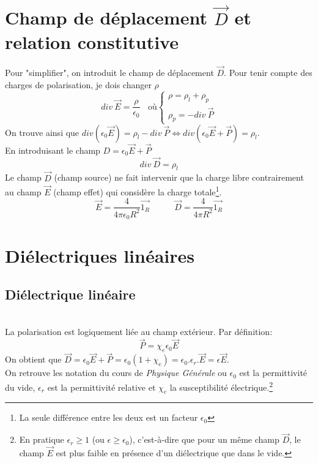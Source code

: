 \documentclass[11pt, a4paper, openany]{book}
\begin{document}
		\section{Champ de déplacement $\vec{D}$ et relation constitutive}
		Pour "simplifier", on introduit le champ de déplacement $\vec{D}$. Pour tenir compte des charges de polarisation, je dois changer $\rho$ 
		\begin{equation}
		div\ \vec{E} = \frac{\rho}{\epsilon_0}\ \ \ \ \text{où} \left\{\begin{array}{l}
		\rho = \rho_l + \rho_p\\
		\rho_p = -div\ \vec{P}
		\end{array}\right.
		\end{equation}
		On trouve ainsi que $div(\epsilon_0\vec{E}) = \rho_l - div\ \vec{P} \Leftrightarrow div(\epsilon_0\vec{E} + \vec{P}) = \rho_l$.\\
		En introduisant le champ $D = \epsilon_0\vec{E} + \vec{P}$
		\begin{equation}
		div\ \vec{D} = \rho_l
		\end{equation}
		Le champ $\vec{D}$ (champ source) ne fait intervenir que la charge libre contrairement au champ $\vec{E}$ (champ effet) qui considère la charge totale\footnote{La seule différence entre les deux est un facteur $\epsilon_0$}.
		\begin{equation}
		\vec{E} = \frac{4}{4\pi\epsilon_0R^2}\vec{1_R}\ \ \ \ \ \ \ \ \ \ \ \ \ \vec{D} = \frac{4}{4\pi R^2}\vec{1_R}
		\end{equation}
		
		\section{Diélectriques linéaires}
		\setcounter{subsection}{1}
		\subsection{Diélectrique linéaire}
		\ \\
		La polarisation est logiquement liée au champ extérieur. Par définition:
		\begin{equation}
		\vec{P} = \chi_e \epsilon_0\vec{E}
		\end{equation}
		On obtient que $\vec{D} = \epsilon_0\vec{E} + \vec{P} = \epsilon_0(1+\chi_e) = \epsilon_0.\epsilon_r.\vec{E} = \epsilon\vec{E}$.\\
		On retrouve les notation du cours de \textit{Physique Générale} ou $\epsilon_0$ est la permittivité du vide, $\epsilon_r$ est la permittivité relative et $\chi_e$ la susceptibilité électrique.\footnote{En pratique $\epsilon_r \geq 1$ (ou $\epsilon \geq \epsilon_0$), c'est-à-dire que pour un même champ $\vec{D}$, le champ $\vec{E}$ est plus faible en présence d'un diélectrique que dans le vide.}
		
\end{document}
